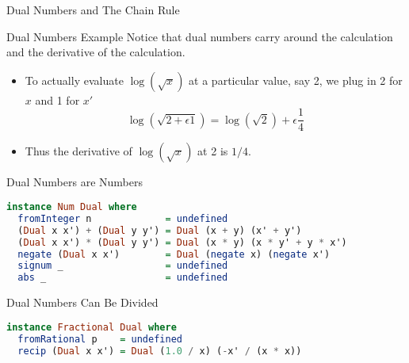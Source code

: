\documentclass{beamer}
\begin{document}
\begin{frame}[fragile]{Dual Numbers and The Chain Rule}

\end{frame}

\begin{frame}[fragile]{Dual Numbers Example}
Notice that dual numbers carry around the calculation and the
derivative of the calculation.

\begin{itemize}
\pause
\item
To actually evaluate $\log(\sqrt{x})$
at a particular value, say 2, we plug in 2 for $x$ and 1 for $x'$
$$
\log (\sqrt{2 + \epsilon 1}) = \log(\sqrt{2}) + \epsilon\frac{1}{4}
$$
\pause
\item
Thus the derivative of $\log(\sqrt{x})$ at 2 is $1/4$.
\end{itemize}
\end{frame}

\begin{frame}[fragile]{Dual Numbers are Numbers}
\begin{scriptsize}
\begin{lstlisting}[language=Haskell]
instance Num Dual where
  fromInteger n             = undefined
  (Dual x x') + (Dual y y') = Dual (x + y) (x' + y')
  (Dual x x') * (Dual y y') = Dual (x * y) (x * y' + y * x')
  negate (Dual x x')        = Dual (negate x) (negate x')
  signum _                  = undefined
  abs _                     = undefined
\end{lstlisting}
\end{scriptsize}
\end{frame}

\begin{frame}[fragile]{Dual Numbers Can Be Divided}
\begin{scriptsize}
\begin{lstlisting}[language=Haskell]
instance Fractional Dual where
  fromRational p    = undefined
  recip (Dual x x') = Dual (1.0 / x) (-x' / (x * x))
\end{lstlisting}
\end{scriptsize}
\end{frame}
\end{document}

